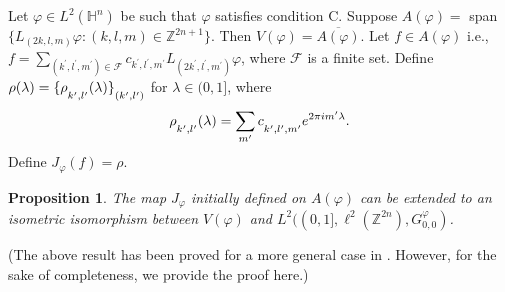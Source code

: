 \documentclass[a4paper,12pt,reqno]{amsart}
\theoremstyle{plain}
\numberwithin{equation}{section}
\newtheorem{prop}{Proposition}[section]
\theoremstyle{definition}
\begin{document}
Let $\varphi\in L^{2}(\mathbb{H}^{n})$ be such that $\varphi$ satisfies condition C. Suppose $A(\varphi)=$ span $\{L_{(2k,l,m)}\varphi:(k,l,m)\in\mathbb{Z}^{2n+1}\}$. Then  $V(\varphi)=\overline{A(\varphi)}$. Let $f\in A(\varphi)$ i.e., $f=\sum\limits_{(k^{\prime},l^{\prime},m^{\prime})\in\mathcal{F}}
c_{k^{\prime},l^{\prime},m^{\prime}}L_{(2k^{\prime},l^{\prime},m^{\prime})}\varphi$, where $\mathcal{F}$ is a finite set. Define $\rho(\lambda)=\fontdimen16\textfont2=5pt \{\rho_{k^{\prime},l^{\prime}}(\lambda)\}_
{(k^{\prime},l^{\prime})}$ for $\lambda\in (0,1]$, where
\begin{eqnarray}\label{3pr1}
\fontdimen16\textfont2=5pt \rho_{k^{\prime},l^{\prime}}(\lambda)=\sum\limits_{m^{\prime}}
c_{k^{\prime},l^{\prime},m^{\prime}}e^{2\pi im^{\prime}\lambda}.
\end{eqnarray}
Define $J_{\varphi}(f)=\rho$.
\begin{prop}
The map $J_{\varphi}$ initially defined on $A(\varphi)$ can be extended to an isometric isomorphism between $V(\varphi)$ and $L^{2}((0,1],\ell^{2}(\mathbb{Z}^{2n}),G_{0,0}^{\varphi})$.
\end{prop}
(The above result has been proved for a more general case in \cite{ra}. However, for the sake of completeness, we provide the proof here.)
\end{document}
